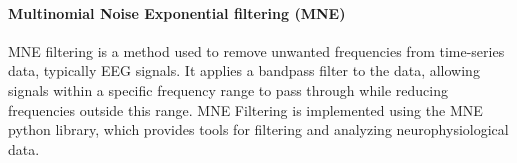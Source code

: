 \documentclass[conference]{IEEEtran}
\begin{document}




\paragraph{Multinomial Noise Exponential filtering (MNE)} MNE filtering is a method used to remove unwanted frequencies from time-series data, typically EEG signals. It applies a bandpass filter to the data, allowing signals within a specific frequency range to pass through while reducing frequencies outside this range. MNE Filtering is implemented using the MNE python library, which provides tools for filtering and analyzing neurophysiological data. 
\end{document}
